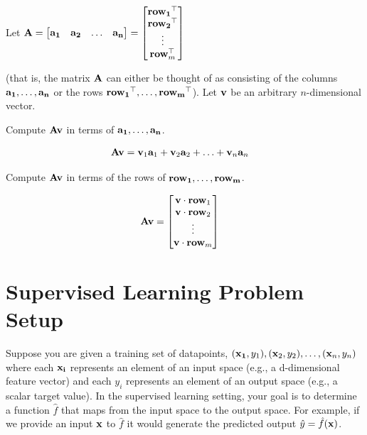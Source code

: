 \documentclass[assignment01_Solutions]{subfiles}
\begin{document}
\begin{exercise}[(20 minutes)]
\item Let $\mathbf{A} = \begin{bmatrix} \mathbf{a_1} & \mathbf{a_2} & \ldots & \mathbf{a_n} \end{bmatrix} = \begin{bmatrix} \mathbf{row_1}^\top \\ \mathbf{row_2}^\top \\ \vdots \\ \mathbf{row}_m^\top \end{bmatrix}$

(that is, the matrix $\mathbf{A}$ can either be thought of as consisting of the columns $\mathbf{a_1}, \ldots, \mathbf{a_n}$ or the rows $\mathbf{row_1}^\top, \ldots, \mathbf{row_m}^\top$).  Let $\mathbf{v}$ be an arbitrary $n$-dimensional vector.

Compute $\mathbf{A}\mathbf{v}$ in terms of $\mathbf{a_1}, \ldots, \mathbf{a_n}$.

\begin{boxedsolution}
\begin{align}
\mathbf{A} \mathbf{v} &= \mathbf{v}_1 \mathbf{a}_1 + \mathbf{v}_2 \mathbf{a}_2 + \ldots + \mathbf{v}_n \mathbf{a}_n
\end{align}
\end{boxedsolution}

Compute $\mathbf{A} \mathbf{v}$ in terms of the rows of $\mathbf{row_1}, \ldots, \mathbf{row_m}$.

\begin{boxedsolution}
\begin{align}
\mathbf{A} \mathbf{v} &= \begin{bmatrix} \mathbf{v} \cdot \mathbf{row}_1 \\   \mathbf{v} \cdot \mathbf{row}_2 \\ \vdots \\ \mathbf{v} \cdot \mathbf{row}_m \end{bmatrix}
\end{align}
\end{boxedsolution}

\ees
\end{exercise}


\section{Supervised Learning Problem Setup}
Suppose you are given a training set of datapoints, $(\mathbf{x_1}, y_1), (\mathbf{x}_2, y_2), \ldots, (\mathbf{x}_n, y_n)$ where each $\mathbf{x_i}$ represents an element of an input space (e.g., a d-dimensional feature vector) and each $y_i$ represents an element of an output space (e.g., a scalar target value).  In the supervised learning setting, your goal is to determine a function $\hat{f}$ that maps from the input space to the output space.  For example, if we provide an input $\mathbf{x}$ to $\hat{f}$ it would generate the predicted output $\hat{y} = \hat{f}(\mathbf{x})$.
\end{document}
